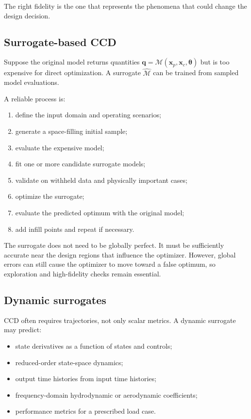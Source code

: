 \documentclass[11pt]{article}
\newcommand{\vect}[1]{\boldsymbol{#1}}
\newcommand{\xp}{\vect{x}_p}
\newcommand{\xc}{\vect{x}_c}
\newcommand{\thetavec}{\boldsymbol{\theta}}
\begin{document}
The right fidelity is the one that represents the phenomena that could change the design decision.

\subsection{Surrogate-based CCD}

Suppose the original model returns quantities $\vect{q}=\mathcal{M}(\xp,\xc,\thetavec)$ but is too expensive for direct optimization. A surrogate $\widehat{\mathcal{M}}$ can be trained from sampled model evaluations.

A reliable process is:
\begin{enumerate}[leftmargin=1.5em]
  \item define the input domain and operating scenarios;
  \item generate a space-filling initial sample;
  \item evaluate the expensive model;
  \item fit one or more candidate surrogate models;
  \item validate on withheld data and physically important cases;
  \item optimize the surrogate;
  \item evaluate the predicted optimum with the original model;
  \item add infill points and repeat if necessary.
\end{enumerate}

The surrogate does not need to be globally perfect. It must be sufficiently accurate near the design regions that influence the optimizer. However, global errors can still cause the optimizer to move toward a false optimum, so exploration and high-fidelity checks remain essential.

\subsection{Dynamic surrogates}

CCD often requires trajectories, not only scalar metrics. A dynamic surrogate may predict:
\begin{itemize}[leftmargin=1.4em]
  \item state derivatives as a function of states and controls;
  \item reduced-order state-space dynamics;
  \item output time histories from input time histories;
  \item frequency-domain hydrodynamic or aerodynamic coefficients;
  \item performance metrics for a prescribed load case.
\end{itemize}
\end{document}

